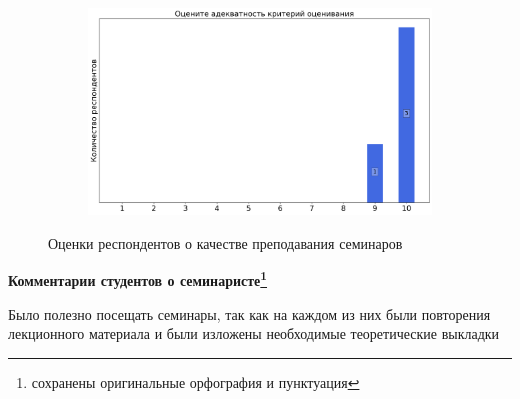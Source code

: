 \begin{figure}[H]
\begin{subfigure}[b]{0.45\textwidth}
			\end{subfigure}
			\begin{subfigure}[b]{0.45\textwidth}
				\centering
				\includegraphics[width=\textwidth]{images/2 course/Аналитическая механика/seminarists-marks-Амелькин Н.И.-3.png}
			\end{subfigure}	
			\caption{Оценки респондентов о качестве преподавания семинаров}
		\end{figure}

		\textbf{Комментарии студентов о семинаристе\protect\footnote{сохранены оригинальные орфография и пунктуация}}
            \begin{commentbox} 
                Было полезно посещать семинары, так как на каждом из них были повторения лекционного материала и были изложены необходимые теоретические выкладки 
            \end{commentbox}

    

